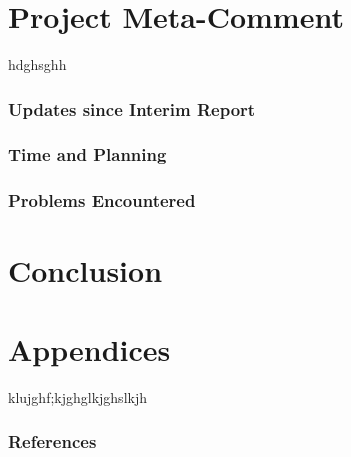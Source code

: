 \documentclass[10pt,a4paper]{article}
\begin{document}
\part{Project Meta-Comment}
hdghsghh
\section{Updates since Interim Report}

\section{Time and Planning}

\section{Problems Encountered}


\part{Conclusion}

\part{Appendices}
klujghf;kjghglkjghslkjh
\section{References}


\end{document}
